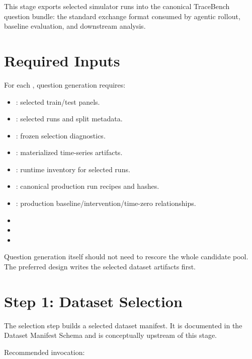 \documentclass[11pt]{article}
\begin{document}
\label{docstart:generate_question_stage}

This stage exports selected simulator runs into the canonical TraceBench question bundle: the standard exchange format consumed by agentic rollout, baseline evaluation, and downstream analysis.

\section*{Required Inputs}

For each \termSimulator, question generation requires:

\begin{itemize}
\item {}: selected train/test panels.
\item {}: selected runs and split metadata.
\item {}: frozen selection diagnostics.
\item {}: materialized time-series artifacts.
\item {}: runtime inventory for selected runs.
\item {}: canonical production run recipes and hashes.
\item {}: production baseline/intervention/time-zero relationships.
\item {}
\item {}
\item {}
\end{itemize}

Question generation itself should not need to rescore the whole candidate pool.
The preferred design writes the selected dataset artifacts first.

\section*{Step 1: Dataset Selection}

The selection step builds a selected dataset manifest.
It is documented in the Dataset Manifest Schema and is conceptually upstream of this stage.

Recommended invocation:
\end{document}
